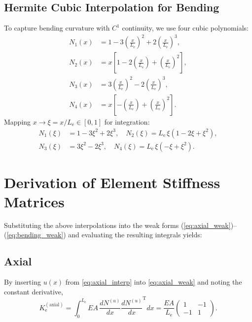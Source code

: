 \documentclass{article}
\begin{document}
	\subsection{Hermite Cubic Interpolation for Bending}
	To capture bending curvature with \(C^1\) continuity, we use four cubic polynomials: 
	\begin{equation}\label{eq:cubic_interp}
		\begin{aligned}
			N_1(x)&=1-3(\tfrac{x}{L_\mathrm{e}})^2+2(\tfrac{x}{L_\mathrm{e}})^3,\\
			N_2(x)&=x[1-2(\tfrac{x}{L_\mathrm{e}})+(\tfrac{x}{L_\mathrm{e}})^2],\\
			N_3(x)&=3(\tfrac{x}{L_\mathrm{e}})^2-2(\tfrac{x}{L_\mathrm{e}})^3,\\
			N_4(x)&=x[-(\tfrac{x}{L_\mathrm{e}})+(\tfrac{x}{L_\mathrm{e}})^2].
		\end{aligned}
	\end{equation}
	Mapping \(x\to\xi=x/L_\mathrm{e}\in[0,1]\) for integration:
	\begin{equation}\label{eq:map_interp}
		\begin{aligned}
			N_1(\xi)&=1-3\xi^2+2\xi^3,\quad
			N_2(\xi)=L_\mathrm{e}\,\xi(1-2\xi+\xi^2),\\
			N_3(\xi)&=3\xi^2-2\xi^3,\quad
			N_4(\xi)=L_\mathrm{e}\,\xi(-\xi+\xi^2).
		\end{aligned}
	\end{equation}
	
	\section{Derivation of Element Stiffness Matrices}
	Substituting the above interpolations into the weak forms (\ref{eq:axial_weak})–(\ref{eq:bending_weak}) and evaluating the resulting integrals yields:
	
	\subsection{Axial}
	By inserting \(u(x)\) from \eqref{eq:axial_interp} into \eqref{eq:axial_weak} and noting the constant derivative,
	\begin{equation}\label{eq:ke_axial}
		K_\mathrm{e}^{(\mathrm{axial})}
		= \int_0^{L_\mathrm{e}}EA\,\frac{dN^{(u)}}{dx}\frac{dN^{(u)}}{dx}^\text{T}dx
		= \frac{EA}{L_\mathrm{e}}
		\begin{pmatrix}1 & -1\\ -1 & 1\end{pmatrix}.
	\end{equation}
\end{document}

